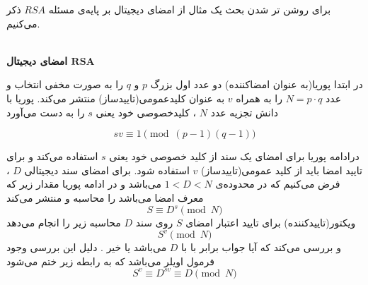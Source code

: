 برای روشن تر شدن بحث یک مثال از امضای دیجیتال بر پایه‌ی مسئله 
$RSA$
ذکر می‌کنیم.
\\
\\
\begin{example}\label{ex_rsa_sig}
	
\textbf{
 امضای دیجیتال 
$\textbf{RSA}$
}\label{ex_ds} {

}

در ابتدا پوریا(به عنوان امضاکننده) دو عدد اول بزرگ  
$p$
و
$q$
را به صورت مخفی انتخاب و عدد
$N = p\cdot q$
را به همراه
$v$
 به عنوان کلید‌عمومی(تاییدساز)  منتشر می‌کند. پوریا با دانش تجزیه عدد
$N$
، کلیدخصوصی خود یعنی 
$s$
را به دست می‌آورد

$$ sv \equiv 1 \pmod {(p-1) (q-1)}$$

درادامه پوریا برای امضای یک سند از کلید خصوصی خود یعنی
$s$
استفاده می‌کند و برای تایید امضا باید از کلید عمومی(تاییدساز)
$v$
استفاده شود.
برای امضای سند دیجیتالی 
$D$
، فرض می‌کنیم که در محدوده‌ی 
$1 < D < N$
می‌باشد و در ادامه پوریا مقدار زیر که معرف امضا می‌باشد را محاسبه و منتشر می‌کند
$$S \equiv D^s \pmod N$$ 
ویکتور(تاییدکننده) برای تایید اعتبار امضای 
$S$
روی سند
$D$
محاسبه زیر را انجام می‌دهد
$$ S^v \pmod N $$
و بررسی می‌کند که آیا جواب برابر با با 
$D$
می‌باشد یا خیر . دلیل این بررسی وجود فرمول اویلر می‌باشد که به رابطه زیر ختم می‌شود
$$ S^v \equiv D^{sv} \equiv D \pmod{N} $$

\end{example}